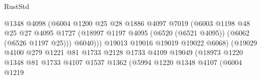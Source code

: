 \begin{lexlean}{RustStd}
\begin{coremodule}
                                            @1348
                                            @4098
                                            (@6004
                                              @1200
                                              @25
                                              @28
                                              @1886
                                              @4097
                                              @7019
                                              (@6003
                                                @1198
                                                @48
                                                @25
                                                @27
                                                @4095
                                                @1727
                                                (@18997
                                                  @1197
                                                  @4095
                                                  (@6520 (@6521 @4095))
                                                  (@6062 (@6526 @1197 @25)))
                                                @6040)))
                                          @19013
                                          @19016
                                          @19019
                                          @19022
                                          @6068)
                                        (@19029
                                          @4100
                                          @279
                                          @1221
                                          @81
                                          @1733
                                          @2128
                                          @1733
                                          @4109
                                          @19049
                                          (@18973
                                            @1220
                                            @1348
                                            @81
                                            @1733
                                            @4107
                                            @1537
                                            @1362
                                            (@5994
                                              @1220
                                              @1348
                                              @4107
                                              (@6004
                                                @1219

\end{coremodule}
\end{lexlean}
